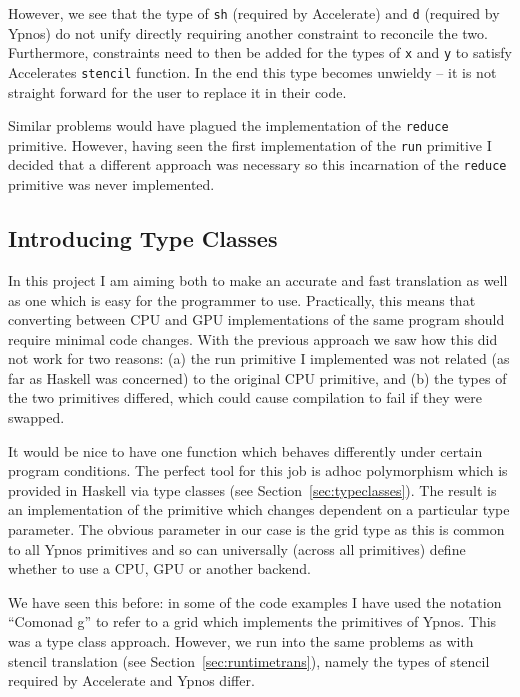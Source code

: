 \documentclass[12pt,a4paper,twoside]{scrbook}
\begin{document}
However, we see that the type of \texttt{sh} (required by Accelerate) and
\texttt{d} (required by Ypnos) do not unify directly requiring another
constraint to reconcile the two. Furthermore, constraints need to then be added
for the types of \texttt{x} and \texttt{y} to satisfy Accelerates
\texttt{stencil} function. In the end this type becomes unwieldy -- it is not
straight forward for the user to replace it in their code.

Similar problems would have plagued the implementation of the \texttt{reduce}
primitive. However, having seen the first implementation of the \texttt{run}
primitive I decided that a different approach was necessary so this incarnation
of the \texttt{reduce} primitive was never implemented.

\subsection{Introducing Type Classes}

In this project I am aiming both to make an accurate and fast translation as
well as one which is easy for the programmer to use.  Practically, this means
that converting between CPU and GPU implementations of the same program should
require minimal code changes.  With the previous approach we saw how this did
not work for two reasons: (a) the run primitive I implemented was not related
(as far as Haskell was concerned) to the original CPU primitive, and (b) the
types of the two primitives differed, which could cause compilation to fail if
they were swapped.

It would be nice to have one function which behaves differently under certain
program conditions. The perfect tool for this job is adhoc polymorphism which is
provided in Haskell via type classes (see Section~\ref{sec:typeclasses}). The result is an implementation of the
primitive which changes dependent on a particular type parameter. The obvious
parameter in our case is the grid type as this is common to all Ypnos primitives
and so can universally (across all primitives) define whether to use a CPU, GPU
or another backend.

We have seen this before: in some of the code examples I have used the notation
``Comonad g'' to refer to a grid which implements the primitives of Ypnos. This
was a type class approach. However, we run into the same problems as with
stencil translation (see Section~\ref{sec:runtimetrans}), namely the types of
stencil required by Accelerate and Ypnos differ.
\end{document}
